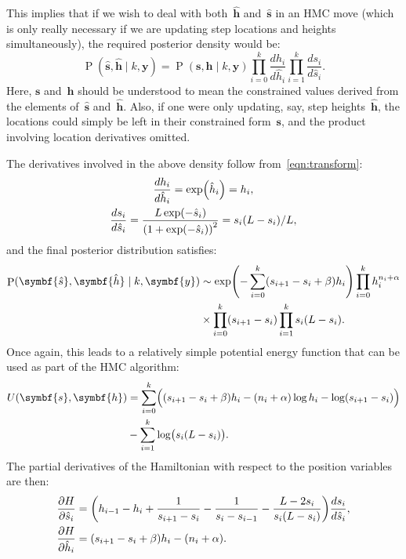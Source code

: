 \documentclass[11pt,a4paper]{article}
\newcommand\ub[1]{\symbf{#1}}                    %
\DeclareMathOperator\Pb{P}                       %
\DeclarePairedDelimiter\lr{\lparen}{\rparen}     %
\theoremstyle{definition}
\begin{document}
This implies that if we wish to deal with both~$\ub{\hat{h}}$ and~$\ub{\hat{s}}$
in an HMC move (which is only really necessary if we are updating step locations
and heights simultaneously), the required posterior density would be:
\[ \Pb(\ub{\hat{s}},\ub{\hat{h}} \mid k,\ub{y})
  = \Pb(\ub{s},\ub{h} \mid k,\ub{y}) \prod_{i=0}^k \frac{dh_i}{d\hat{h}_i}
      \prod_{i=1}^k \frac{ds_i}{d\hat{s}_i}. \]
Here, $\ub{s}$ and~$\ub{h}$ should be understood to mean the constrained values
derived from the elements of~$\ub{\hat{s}}$ and~$\ub{\hat{h}}$. Also, if one
were only updating, say, step heights~$\ub{\hat{h}}$, the locations could simply
be left in their constrained form~$\ub{s}$, and the product involving location
derivatives omitted.

The derivatives involved in the above density follow from~\eqref{eqn:transform}:
\begin{gather*}
  \frac{dh_i}{d\hat{h}_i}
    = \exp\lr*{\hat{h}_i} = h_i, \\
  \frac{ds_i}{d\hat{s}_i}
    = \frac{L\exp\lr*{-\hat{s}_i}}{\lr*{1+\exp\lr*{-\hat{s}_i}}^2}
    = s_i(L-s_i)/L,
\end{gather*}
and the final posterior distribution satisfies:
\begin{align*}
  \Pb(\ub{\hat{s}},\ub{\hat{h}} \mid k,\ub{y})
    &\sim \exp\lr*{-\sum_{i=0}^k (s_{i+1} - s_i + \beta)h_i}
      \prod_{i=0}^k h_i^{n_i+\alpha} \\
    &\times \prod_{i=0}^k (s_{i+1} - s_i) \prod_{i=1}^k s_i(L-s_i).
\end{align*}
Once again, this leads to a relatively simple potential energy function that can
be used as part of the HMC algorithm:
\begin{equation}\label{eqn:potential}
\begin{aligned}
  U(\ub{s},\ub{h}) &= \sum_{i=0}^k \lr[\Big]{(s_{i+1} - s_i + \beta)h_i
      - (n_i+\alpha)\log h_i - \log(s_{i+1} - s_i)} \\
    &- \sum_{i=1}^k \log\lr[\big]{s_i(L-s_i)}.
\end{aligned}
\end{equation}
The partial derivatives of the Hamiltonian with respect to the position
variables are then:
\begin{equation}\label{eqn:hamilton q}
\begin{aligned}
  \frac{\partial H}{\partial \hat{s}_i} &= \lr*{h_{i-1} - h_i
    + \frac{1}{s_{i+1} - s_i} - \frac{1}{s_i - s_{i-1}}
    - \frac{L-2s_i}{s_i(L-s_i)}} \frac{ds_i}{d\hat{s}_i}, \\
  \frac{\partial H}{\partial \hat{h}_i} &= (s_{i+1} - s_i + \beta)h_i
    - (n_i+\alpha).
\end{aligned}
\end{equation}
\end{document}
